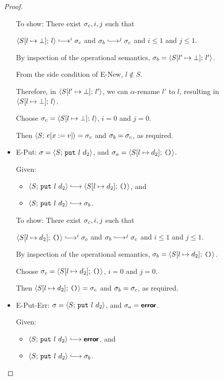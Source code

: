 \begin{proof}
\begin{itemize}
      To show: There exist $\sigma_c, i, j$ such that

      $\config{\extSRaw{S}{l}{\bot}}{l} \parstepsto^i
      \conf_c$ and $\conf_b \parstepsto^j \conf_c$ and $i \leq 1$ and
      $j \leq 1$.

      By inspection of the operational semantics, $\sigma_b =
      \langle S[l' \mapsto \bot];\, l' \rangle$.

      From the side condition of {\sc E-New}, $l \notin S$.

      Therefore, in $\langle S[l' \mapsto \bot];\, l' \rangle$,
      we can $\alpha$-rename $l'$ to $l$, resulting in
      $\langle S[l \mapsto \bot];\, l \rangle$.

      Choose $\sigma_c = \langle S[l \mapsto \bot];\, l \rangle$,
      $i = 0$ and $j = 0$.

      Then $\langle S;\, e[x := v] \rangle = \sigma_c$ and $\sigma_b =
      \sigma_c$, as required.

    \item {\sc E-Put}: $\sigma = \langle S;\, \mbox{\texttt{put}}~l~d_2 \rangle$, and
      $\sigma_a = \langle S[l \mapsto d_2];\, \mbox{\texttt{()}} \rangle$.

      Given:
      \begin{itemize}
      \item $\config{S}{\putexp{l}{d_2}} \parstepsto
        \config{\extSRaw{S}{l}{d_2}}{\unit}$, and
      \item $\config{S}{\putexp{l}{d_2}} \parstepsto \conf_b$.
      \end{itemize}

      To show: There exist $\sigma_c, i, j$ such that

      $\config{\extSRaw{S}{l}{d_2}}{\unit} \parstepsto^i \conf_c$ and
      $\conf_b \parstepsto^j \conf_c$ and $i \leq 1$ and $j \leq 1$.

      By inspection of the operational semantics, $\sigma_b =
      \langle S[l \mapsto d_2];\, \mbox{\texttt{()}} \rangle$.

      Choose $\sigma_c = \langle S[l \mapsto d_2];\, \mbox{\texttt{()}} \rangle$, $i = 0$
      and $j = 0$.

      Then $\langle S[l \mapsto d_2];\, \mbox{\texttt{()}} \rangle = \sigma_c$ and $\sigma_b
      = \sigma_c$, as required.

    \item {\sc E-Put-Err}: $\sigma = \langle S;\, \mbox{\texttt{put}}~l~d_2 \rangle$, and
      $\sigma_a = \textbf{\textsf{error}}$.

      Given:
      \begin{itemize}
      \item $\config{S}{\putexp{l}{d_2}} \parstepsto \error$, and
      \item $\config{S}{\putexp{l}{d_2}} \parstepsto \conf_b$.
      \end{itemize}


\end{itemize}
\end{proof}
